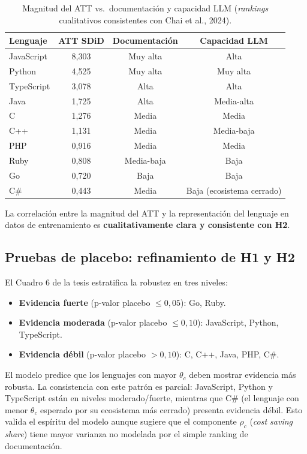 \documentclass[11pt,a4paper]{article}
\theoremstyle{definition}
\begin{document}
\begin{table}[h!]
\centering
\small
\renewcommand{\arraystretch}{1.20}
\begin{tabular}{lccc}
\toprule
\textbf{Lenguaje} & \textbf{ATT SDiD} & \textbf{Documentación} & \textbf{Capacidad LLM} \\
\midrule
JavaScript & 8,303 & Muy alta & Alta \\
Python     & 4,525 & Muy alta & Muy alta \\
TypeScript & 3,078 & Alta     & Alta \\
Java       & 1,725 & Alta     & Media-alta \\
C          & 1,276 & Media    & Media \\
C++        & 1,131 & Media    & Media-baja \\
PHP        & 0,916 & Media    & Media \\
Ruby       & 0,808 & Media-baja & Baja \\
Go         & 0,720 & Baja     & Baja \\
C\#        & 0,443 & Media    & Baja (ecosistema cerrado) \\
\bottomrule
\end{tabular}
\caption{Magnitud del ATT vs.\ documentación y capacidad LLM (\textit{rankings} cualitativos consistentes con Chai et al., 2024).}
\end{table}

La correlación entre la magnitud del ATT y la representación del lenguaje en datos de entrenamiento es \textbf{cualitativamente clara y consistente con H2}.

\subsection{Pruebas de placebo: refinamiento de H1 y H2}

El Cuadro 6 de la tesis estratifica la robustez en tres niveles:
\begin{itemize}[leftmargin=*]
  \item \textbf{Evidencia fuerte} (p-valor placebo $\leq 0{,}05$): Go, Ruby.
  \item \textbf{Evidencia moderada} (p-valor placebo $\leq 0{,}10$): JavaScript, Python, TypeScript.
  \item \textbf{Evidencia débil} (p-valor placebo $> 0{,}10$): C, C++, Java, PHP, C\#.
\end{itemize}

El modelo predice que los lenguajes con mayor $\theta_c$ deben mostrar evidencia más robusta. La consistencia con este patrón es parcial: JavaScript, Python y TypeScript están en niveles moderado/fuerte, mientras que C\# (el lenguaje con menor $\theta_c$ esperado por su ecosistema más cerrado) presenta evidencia débil. Esto valida el espíritu del modelo aunque sugiere que el componente $\rho_c$ (\textit{cost saving share}) tiene mayor varianza no modelada por el simple ranking de documentación.
\end{document}
